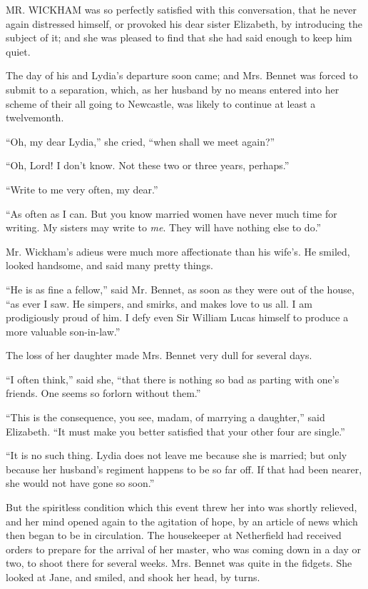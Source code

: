\documentclass[12pt,openright]{book}
\begin{document}
\noindent  MR. WICKHAM was so perfectly satisfied with this conversation, that he never again distressed himself, or provoked his dear sister Elizabeth, by introducing the subject of it; and she was pleased to find that she had said enough to keep him quiet.

The day of his and Lydia’s departure soon came; and Mrs. Bennet was forced to submit to a separation, which, as her husband by no means entered into her scheme of their all going to Newcastle, was likely to continue at least a twelvemonth.

“Oh, my dear Lydia,” she cried, “when shall we meet again?”

“Oh, Lord! I don’t know. Not these two or three years, perhaps.”

“Write to me very often, my dear.”

“As often as I can. But you know married women have never much time for writing. My sisters may write to \textit{me}. They will have nothing else to do.”

Mr. Wickham’s adieus were much more affectionate than his wife’s. He smiled, looked handsome, and said many pretty things.

“He is as fine a fellow,” said Mr. Bennet, as soon as they were out of the house, “as ever I saw. He simpers, and smirks, and makes love to us all. I am prodigiously proud of him. I defy even Sir William Lucas himself to produce a more valuable son-in-law.”

The loss of her daughter made Mrs. Bennet very dull for several days.

“I often think,” said she, “that there is nothing so bad as parting with one’s friends. One seems so forlorn without them.”

“This is the consequence, you see, madam, of marrying a daughter,” said Elizabeth. “It must make you better satisfied that your other four are single.”

“It is no such thing. Lydia does not leave me because she is married; but only because her husband’s regiment happens to be so far off. If that had been nearer, she would not have gone so soon.”

But the spiritless condition which this event threw her into was shortly relieved, and her mind opened again to the agitation of hope, by an article of news which then began to be in circulation. The housekeeper at Netherfield had received orders to prepare for the arrival of her master, who was coming down in a day or two, to shoot there for several weeks. Mrs. Bennet was quite in the fidgets. She looked at Jane, and smiled, and shook her head, by turns.
\end{document}
